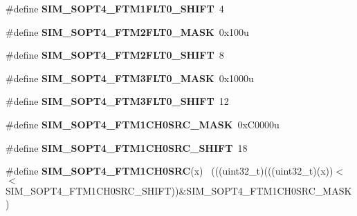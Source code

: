 \begin{DoxyCompactItemize}
\item 
\hypertarget{group___s_i_m___register___masks_ga9fb8861affd661f64719260a43a87ec6}{}\#define {\bfseries S\+I\+M\+\_\+\+S\+O\+P\+T4\+\_\+\+F\+T\+M1\+F\+L\+T0\+\_\+\+S\+H\+I\+F\+T}~4\label{group___s_i_m___register___masks_ga9fb8861affd661f64719260a43a87ec6}

\item 
\hypertarget{group___s_i_m___register___masks_ga4f61f56a63a5d239be393708c17cf82c}{}\#define {\bfseries S\+I\+M\+\_\+\+S\+O\+P\+T4\+\_\+\+F\+T\+M2\+F\+L\+T0\+\_\+\+M\+A\+S\+K}~0x100u\label{group___s_i_m___register___masks_ga4f61f56a63a5d239be393708c17cf82c}

\item 
\hypertarget{group___s_i_m___register___masks_ga15275ae91c6efbf697f472b940369401}{}\#define {\bfseries S\+I\+M\+\_\+\+S\+O\+P\+T4\+\_\+\+F\+T\+M2\+F\+L\+T0\+\_\+\+S\+H\+I\+F\+T}~8\label{group___s_i_m___register___masks_ga15275ae91c6efbf697f472b940369401}

\item 
\hypertarget{group___s_i_m___register___masks_ga94a2b4111642b78585a992d67795b04c}{}\#define {\bfseries S\+I\+M\+\_\+\+S\+O\+P\+T4\+\_\+\+F\+T\+M3\+F\+L\+T0\+\_\+\+M\+A\+S\+K}~0x1000u\label{group___s_i_m___register___masks_ga94a2b4111642b78585a992d67795b04c}

\item 
\hypertarget{group___s_i_m___register___masks_ga9a9a64cd84c357ba5c5459aca027465c}{}\#define {\bfseries S\+I\+M\+\_\+\+S\+O\+P\+T4\+\_\+\+F\+T\+M3\+F\+L\+T0\+\_\+\+S\+H\+I\+F\+T}~12\label{group___s_i_m___register___masks_ga9a9a64cd84c357ba5c5459aca027465c}

\item 
\hypertarget{group___s_i_m___register___masks_ga8be459723f070708becab666dc6abc47}{}\#define {\bfseries S\+I\+M\+\_\+\+S\+O\+P\+T4\+\_\+\+F\+T\+M1\+C\+H0\+S\+R\+C\+\_\+\+M\+A\+S\+K}~0x\+C0000u\label{group___s_i_m___register___masks_ga8be459723f070708becab666dc6abc47}

\item 
\hypertarget{group___s_i_m___register___masks_gaee4e8fb1805bded49220a407c1620345}{}\#define {\bfseries S\+I\+M\+\_\+\+S\+O\+P\+T4\+\_\+\+F\+T\+M1\+C\+H0\+S\+R\+C\+\_\+\+S\+H\+I\+F\+T}~18\label{group___s_i_m___register___masks_gaee4e8fb1805bded49220a407c1620345}

\item 
\hypertarget{group___s_i_m___register___masks_gadce9eb5cf4628062440e4c30611c8681}{}\#define {\bfseries S\+I\+M\+\_\+\+S\+O\+P\+T4\+\_\+\+F\+T\+M1\+C\+H0\+S\+R\+C}(x)                                ~(((uint32\+\_\+t)(((uint32\+\_\+t)(x))$<$$<$S\+I\+M\+\_\+\+S\+O\+P\+T4\+\_\+\+F\+T\+M1\+C\+H0\+S\+R\+C\+\_\+\+S\+H\+I\+F\+T))\&S\+I\+M\+\_\+\+S\+O\+P\+T4\+\_\+\+F\+T\+M1\+C\+H0\+S\+R\+C\+\_\+\+M\+A\+S\+K)\label{group___s_i_m___register___masks_gadce9eb5cf4628062440e4c30611c8681}


\end{DoxyCompactItemize}
